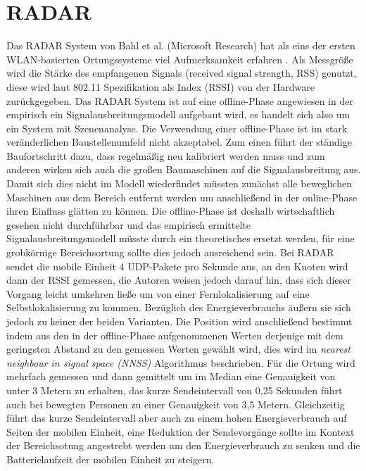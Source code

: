 \section{RADAR}
\label{ch:Vorherige:sec:RADAR}
Das RADAR System von Bahl et al. (Microsoft Research) hat als eins der ersten WLAN-basierten Ortungssysteme viel Aufmerksamkeit erfahren \cite{bahl2000radar}.
Als Messgröße wird die Stärke des empfangenen Signals (received signal strength, RSS) genutzt, diese wird laut 802.11 Spezifikation als Index (RSSI) von der Hardware zurückgegeben. 
Das RADAR System ist auf eine offline-Phase angewiesen in der empirisch ein Signalausbreitungsmodell aufgebaut wird, es handelt sich also um ein System mit Szenenanalyse.
Die Verwendung einer offline-Phase ist im stark veränderlichen Baustellenumfeld nicht akzeptabel. 
Zum einen führt der ständige Baufortschritt dazu, dass regelmäßig neu kalibriert werden muss und zum anderen wirken sich auch die großen Baumaschinen auf die Signalausbreitung aus. 
Damit sich dies nicht im Modell wiederfindet müssten zunächst alle beweglichen Maschinen aus dem Bereich entfernt werden um anschließend in der online-Phase ihren Einfluss glätten zu können.
Die offline-Phase ist deshalb wirtschaftlich gesehen nicht durchführbar und das empirisch ermittelte Signalausbreitungsmodell müsste durch ein theoretisches ersetzt werden, für eine grobkörnige Bereichsortung sollte dies jedoch ausreichend sein.
Bei RADAR sendet die mobile Einheit 4 UDP-Pakete pro Sekunde aus, an den Knoten wird dann der RSSI gemessen, die Autoren weisen jedoch darauf hin, dass sich dieser Vorgang leicht umkehren ließe um von einer Fernlokalisierung auf eine Selbstlokalisierung zu kommen.
Bezüglich des Energieverbrauchs äußern sie sich jedoch zu keiner der beiden Varianten.
Die Position wird anschließend bestimmt indem aus den in der offline-Phase aufgenommenen Werten derjenige mit dem geringsten Abstand zu den gemessen Werten gewählt wird, dies wird im \textit{nearest neighbour in signal space (NNSS)} Algorithmus beschrieben.
Für die Ortung wird mehrfach gemessen und dann gemittelt um im Median eine Genauigkeit von unter 3 Metern zu erhalten, das kurze Sendeintervall von 0,25 Sekunden führt auch bei bewegten Personen zu einer Genauigkeit von 3,5 Metern.
Gleichzeitig führt das kurze Sendeintervall aber auch zu einem hohen Energieverbrauch auf Seiten der mobilen Einheit, eine Reduktion der Sendevorgänge sollte im Kontext der Bereichsotung angestrebt werden um den Energieverbrauch zu senken und die Batterielaufzeit der mobilen Einheit zu steigern.

